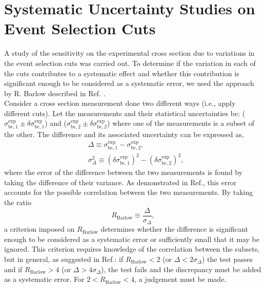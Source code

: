 \documentclass[aps, prl]{revtex4-2}  %
\begin{document}
\section{\large Systematic Uncertainty Studies on Event Selection Cuts}
A study of the sensitivity on the experimental cross section due to variations in the event selection cuts was carried out. 
To determine if the variation in each of the cuts contributes to a systematic effect and whether this contribution is significant
enough to be considered as a systematic error, we used the approach by R. Barlow described in Ref. \cite{barlow2002systematic}.\\
\indent Consider a cross section measurement done two different ways (i.e., apply different cuts). Let the measurements and their
statistical uncertainties be: ($\sigma^{\mathrm{exp}}_{\mathrm{bc,1}}\pm\delta\sigma^{\mathrm{exp}}_{\mathrm{bc,1}}$) and ($\sigma^{\mathrm{exp}}_{\mathrm{bc,2}}\pm\delta\sigma^{\mathrm{exp}}_{\mathrm{bc,2}}$)
where one of the measurements is a subset of the other. The difference and its associated uncertainty can be expressed as,
\begin{subequations}
  \begin{align}
    &\Delta \equiv \sigma^{\mathrm{exp}}_{\mathrm{bc,1}} - \sigma^{\mathrm{exp}}_{\mathrm{bc,2}}, \\
    &\sigma^{2}_{\Delta} \equiv (\delta\sigma^{\mathrm{exp}}_{\mathrm{bc,1}})^{2} - (\delta\sigma^{\mathrm{exp}}_{\mathrm{bc,2}})^{2},
  \end{align}
\end{subequations}
where the error of the difference between the two measurements is found by taking the difference of their variance. As demonstrated in Ref.\cite{barlow2002systematic}, this
error accounts for the possible correlation between the two measurements. By taking the ratio
\begin{equation}
  R_{\mathrm{Barlow}} \equiv \frac{\Delta}{\sigma_{\Delta}},
\end{equation}
a criterion imposed on $R_{\mathrm{Barlow}}$ determines whether the difference is significant enough to be considered as a systematic error or sufficiently small that it may be
ignored. This criterion requires knowledge of the correlation between the subsets, but in general, as suggested in Ref.\cite{barlow2017}: if $R_{\mathrm{Barlow}} < 2$ (or $\Delta <2\sigma_{\Delta}$)
the test passes and if $R_{\mathrm{Barlow}} > 4$ (or $\Delta >4\sigma_{\Delta}$), the test fails and the discrepancy must be added as a systematic error. For $2<R_{\mathrm{Barlow}}<4$, a judgement must be made.\\
\end{document}
